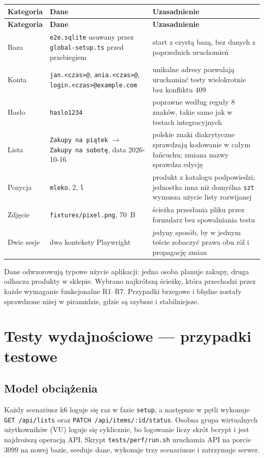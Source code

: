 \documentclass[a4paper,11pt]{article}
\newcommand{\code}[1]{\texttt{\small #1}}
\begin{document}
{\small
\begin{xltabular}{\textwidth}{@{}l L L@{}}
\toprule
\textsf{\textbf{Kategoria}} & \textsf{\textbf{Dane}} & \textsf{\textbf{Uzasadnienie}}\\
\midrule
\endfirsthead
\toprule
\textsf{\textbf{Kategoria}} & \textsf{\textbf{Dane}} & \textsf{\textbf{Uzasadnienie}}\\
\midrule
\endhead
\bottomrule
\endfoot
Baza & \code{e2e.sqlite} usuwany przez \code{global-setup.ts} przed przebiegiem & start z czystą bazą, bez danych z poprzednich uruchomień\\
Konta & \code{jan.<czas>@}, \code{ania.<czas>@}, \code{login.<czas>@example.com} & unikalne adresy pozwalają uruchamiać testy wielokrotnie bez konfliktu 409\\
Hasło & \code{haslo1234} & poprawne według reguły 8 znaków, takie samo jak w testach integracyjnych\\
Lista & \code{Zakupy na piątek} $\rightarrow$ \code{Zakupy na sobotę}, data 2026-10-16 & polskie znaki diakrytyczne sprawdzają kodowanie w całym łańcuchu; zmiana nazwy sprawdza edycję\\
Pozycja & \code{mleko}, 2, \code{l} & produkt z katalogu podpowiedzi; jednostka inna niż domyślna \code{szt} wymusza użycie listy rozwijanej\\
Zdjęcie & \code{fixtures/pixel.png}, 70~B & ścieżka przesłania pliku przez formularz bez spowalniania testu\\
Dwie sesje & dwa konteksty Playwright & jedyny sposób, by w jednym teście zobaczyć prawa obu ról i propagację zmian\\
\end{xltabular}
\vspace{-1.2em}}

Dane odwzorowują typowe użycie aplikacji: jedna osoba planuje zakupy, druga odhacza
produkty w sklepie. Wybrano najkrótszą ścieżkę, która przechodzi przez każde wymaganie
funkcjonalne R1–R7. Przypadki brzegowe i błędne zostały sprawdzone niżej w piramidzie,
gdzie są szybsze i stabilniejsze.

\section{Testy wydajnościowe — przypadki testowe}

\subsection{Model obciążenia}
Każdy scenariusz k6 loguje się raz w fazie \code{setup}, a następnie w pętli wykonuje
\code{GET /api/lists} oraz \code{PATCH /api/items/:id/status}. Osobna grupa wirtualnych
użytkowników (VU) loguje się cyklicznie, bo logowanie liczy skrót bcrypt i jest najdroższą
operacją API. Skrypt \code{tests/perf/run.sh} uruchamia API na porcie 3099 na nowej bazie,
seeduje dane, wykonuje trzy scenariusze i zatrzymuje serwer.
\end{document}
